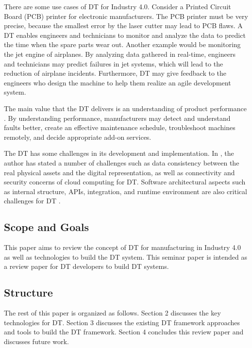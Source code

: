 \documentclass[article,table]{aaltoseries}
\begin{document}
There are some use cases of DT for Industry 4.0. Consider a Printed Circuit Board (PCB) printer for electronic manufacturers. The PCB printer must be very precise, because the smallest error by the laser cutter may lead to PCB flaws. A DT enables engineers and technicians to monitor and analyze the data to predict the time when the spare parts wear out. Another example would be monitoring the jet engine of airplanes. By analyzing data gathered in real-time, engineers and technicians may predict failures in jet systems, which will lead to the reduction of airplane incidents. Furthermore, DT may give feedback to the engineers who design the machine to help them realize an agile development system.

The main value that the DT delivers is an understanding of product performance \cite{Cheatshe3:online}. By understanding performance, manufacturers may detect and understand faults better, create an effective maintenance schedule, troubleshoot machines remotely, and decide appropriate add-on services.

The DT has some challenges in its development and implementation. In \cite{bienhaus2017patterns}, the author has stated a number of challenges such as data consistency between the real physical assets and the digital representation, as well as connectivity and security concerns of cloud computing for DT. Software architectural aspects such as internal structure, APIs, integration, and runtime environment are also critical challenges for DT \cite{malakuti2018architectural}.

\subsection{Scope and Goals}
\label{sec:emphasis}
This paper aims to review the concept of DT for manufacturing in Industry 4.0 as well as technologies to build the DT system. This seminar paper is intended as a review paper for DT developers to build DT systems.

\subsection{Structure}
\label{sec:em}
The rest of this paper is organized as follows. Section 2 discusses the key technologies for DT. Section 3 discusses the existing DT framework approaches and tools to build the DT framework. Section 4 concludes this review paper and discusses future work.
 

\end{document}
